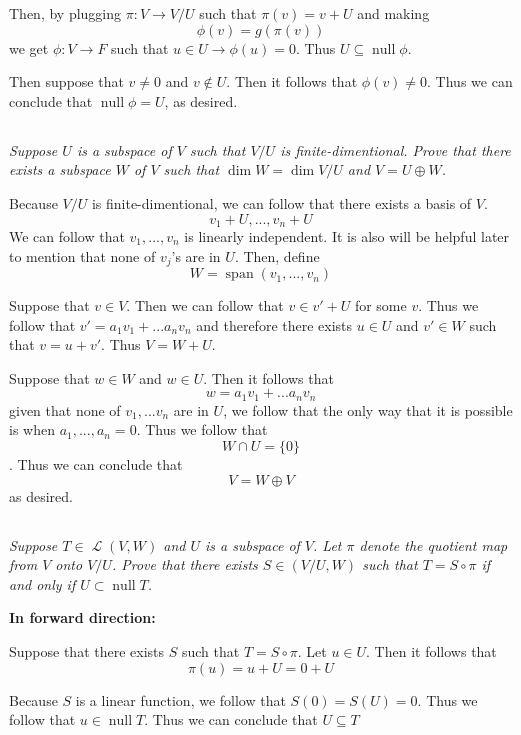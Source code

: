 \documentclass[11pt,oneside,titlepage]{book}
\DeclareMathOperator \map {\mathcal {L}}
\DeclareMathOperator \ns {null}
\DeclareMathOperator \Span {span}
\begin{document}
Then, by plugging $\pi: V \to V/U$ such that  $\pi(v) = v + U$ and
making
$$\phi(v) = g(\pi(v))$$
we get $\phi: V \to F$ such that $u \in U \to \phi(u) = 0$. Thus $U \subseteq \ns \phi$.

Then suppose that $v \neq 0$ and $v \notin U$. Then it follows that $\phi(v) \neq 0$. Thus
we can conclude that $\ns \phi = U$, as desired.

\subsection{}

\textit{Suppose $U$ is a subspace of $V$ such that $V/U$ is finite-dimentional. Prove that
  there exists a subspace $W$ of $V$ such that $\dim W = \dim V/U$ and
  $V = U \oplus W$.}

Because $V/U$ is finite-dimentional, we can follow that there exists a basis of $V$.
$$v_1 + U, ..., v_n + U$$
We can follow that $v_1, ..., v_n$ is linearly independent. It is also will be helpful
later to mention that none of $v_j$'s are in $U$. Then, define
$$W = \Span(v_1, ..., v_n)$$

Suppose that $v \in V$. Then we can follow that $v \in v' + U$ for some $v$.
Thus we follow that $v' = a_1 v_1 + ... a_n v_n$ and therefore
there exists $u \in U$ and $v' \in W$ such that $v = u + v'$. Thus $V = W + U$.

Suppose that $w \in W$ and $w \in U$. Then it follows that
$$w = a_1 v_1 + ... a_n v_n$$
given that none of  $v_1, ... v_n$ are in $U$, we follow that the only way that it is
possible is when $a_1, ..., a_n = 0$. Thus we follow that
$$W \cap U = \{0\}$$.
Thus we can conclude that
$$V = W \oplus V$$
as desired.




\subsection{}

\textit{Suppose $T \in \map(V, W)$ and $U$ is a subspace of $V$. Let $\pi$ denote the
  quotient map from $V$ onto $V/U$. Prove that there exists $S \in (V/U, W)$
  such that $T = S \circ \pi$ if and only if $U \subset \ns T$. }

\textbf{In forward direction: }

Suppose that there exists $S$ such that $T = S \circ \pi$.
Let $u \in U$. Then it follows that
$$\pi(u) = u + U = 0 + U$$

Because $S$ is a linear function, we follow that $S(0) = S(U) = 0$. Thus we follow that
$u \in \ns T$. Thus we can conclude that $U \subseteq T$
\end{document}
